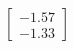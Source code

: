 \documentclass[preview]{standalone}
\begin{document}
\begin{align*}
\begin{bmatrix} -1.57 \\ -1.33 \end{bmatrix}
\end{align*}
\end{document}
